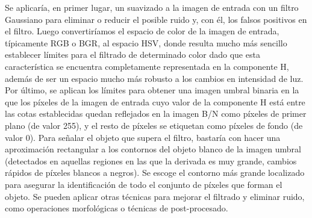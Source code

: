 Se aplicaría, en primer lugar, un suavizado a la imagen de entrada con un filtro Gaussiano para eliminar o reducir el posible ruido y, con él, los falsos positivos en el filtro. Luego convertiríamos el espacio de color de la imagen de entrada, típicamente RGB o BGR, al espacio HSV, donde resulta mucho más sencillo establecer límites para el filtrado de determinado color dado que esta característica se encuentra completamente representada en la componente H, además de ser un espacio mucho más robusto a los cambios en intensidad de luz. Por último, se aplican los límites para obtener una imagen umbral binaria en la que los píxeles de la imagen de entrada cuyo valor de la componente H está entre las cotas establecidas quedan reflejados en la imagen B/N como píxeles de primer plano (de valor 255), y el resto de píxeles se etiquetan como píxeles de fondo (de valor 0). Para señalar el objeto que supera el filtro, bastaría con hacer una aproximación rectangular a los contornos del objeto blanco de la imagen umbral (detectados en aquellas regiones en las que la derivada es muy grande, cambios rápidos de píxeles blancos a negros). Se escoge el contorno más grande localizado para asegurar la identificación de todo el conjunto de píxeles que forman el objeto. Se pueden aplicar otras técnicas para mejorar el filtrado y eliminar ruido, como operaciones morfológicas o técnicas de post-procesado.
